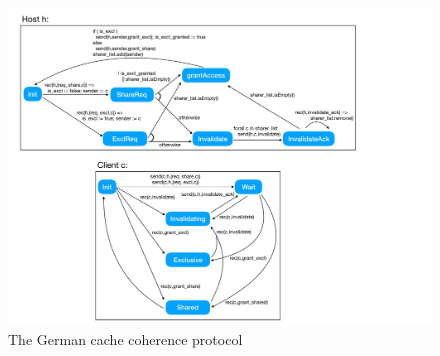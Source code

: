\begin{figure}
\includegraphics[width=12cm]{german.pdf}
\caption{The German cache coherence protocol}
\label{fig:elevator}
\end{figure}


